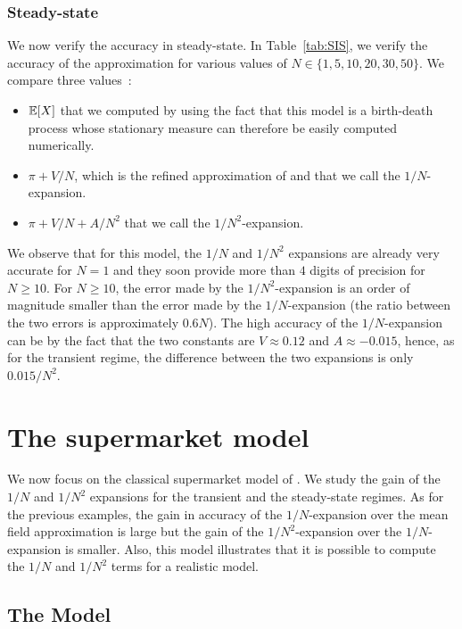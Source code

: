\documentclass[sigconf]{acmart}
\newcommand\esp[1]{{\mathchoice{\besp{#1}}{\sesp{#1}}{\sesp{#1}}{\sesp{#1}}}}
\newcommand\besp[1]{\mathbb{E}\left[#1\right]}
\newcommand\sesp[1]{\mathbb{E}[#1]}
\begin{document}
\subsubsection{Steady-state}
\label{sec:SIS_steady}

We now verify the accuracy in steady-state.  In Table~\ref{tab:SIS},
we verify the accuracy of the approximation for various values of
$N\in\{1,5,10,20,30,50\}$. We compare three values~:
\begin{itemize}
\item $\esp{X}$ that we computed by using the fact that this  model
  is a birth-death process whose stationary measure can therefore be
  easily computed numerically. 
\item $\pi+V/N$, which is the refined approximation of
  \cite{gast2017expected} and that we call the $1/N$-expansion.
\item $\pi+V/N+A/N^2$ that we call the $1/N^2$-expansion.
\end{itemize}
We observe that for this model, the $1/N$ and $1/N^2$ expansions are
already very accurate for $N=1$ and they soon provide more than $4$
digits of precision for $N\ge10$. For $N\ge10$, the error made by the
$1/N^2$-expansion is an order of magnitude smaller than the error made
by the $1/N$-expansion (the ratio between the two errors is
approximately $0.6N$). The high accuracy of the  $1/N$-expansion can be
by the fact that the two constants are
$V\approx0.12$ and $A\approx-0.015$, hence, as for the transient
regime, the difference between the two expansions is only $0.015/N^2$.






\section{The supermarket model}
\label{sec:supermarket}

We now focus on the classical supermarket model of
\cite{mitzenmacher1996power,vvedenskaya1996queueing}. We study the
gain of the $1/N$ and $1/N^2$ expansions for the transient and the 
steady-state regimes. As for the previous examples, the gain in
accuracy of the $1/N$-expansion over the mean field approximation is
large but the gain of the $1/N^2$-expansion over the $1/N$-expansion
is smaller.  Also, this model illustrates that it is possible to
compute the $1/N$ and $1/N^2$ terms for a realistic model.

\subsection{The Model}
\end{document}
